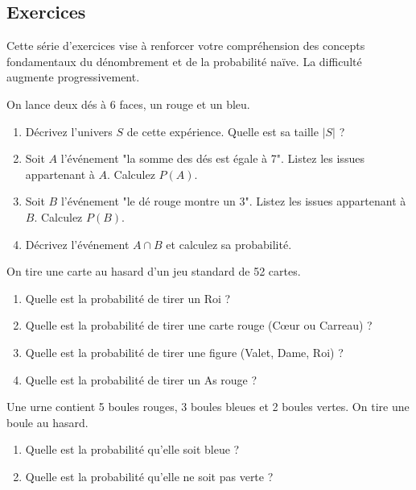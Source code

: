 
\subsection{Exercices}

Cette série d'exercices vise à renforcer votre compréhension des concepts fondamentaux du dénombrement et de la probabilité naïve. La difficulté augmente progressivement.


\begin{exercicebox}
On lance deux dés à 6 faces, un rouge et un bleu.
\begin{enumerate}
    \item Décrivez l'univers $S$ de cette expérience. Quelle est sa taille $|S|$ ?
    \item Soit $A$ l'événement "la somme des dés est égale à 7". Listez les issues appartenant à $A$. Calculez $P(A)$.
    \item Soit $B$ l'événement "le dé rouge montre un 3". Listez les issues appartenant à $B$. Calculez $P(B)$.
    \item Décrivez l'événement $A \cap B$ et calculez sa probabilité.
\end{enumerate}
\end{exercicebox}

\begin{exercicebox}
On tire une carte au hasard d'un jeu standard de 52 cartes.
\begin{enumerate}
    \item Quelle est la probabilité de tirer un Roi ?
    \item Quelle est la probabilité de tirer une carte rouge (Cœur ou Carreau) ?
    \item Quelle est la probabilité de tirer une figure (Valet, Dame, Roi) ?
    \item Quelle est la probabilité de tirer un As rouge ?
\end{enumerate}
\end{exercicebox}

\begin{exercicebox}
Une urne contient 5 boules rouges, 3 boules bleues et 2 boules vertes. On tire une boule au hasard.
\begin{enumerate}
    \item Quelle est la probabilité qu'elle soit bleue ?
    \item Quelle est la probabilité qu'elle ne soit pas verte ?
\end{enumerate}
\end{exercicebox}

